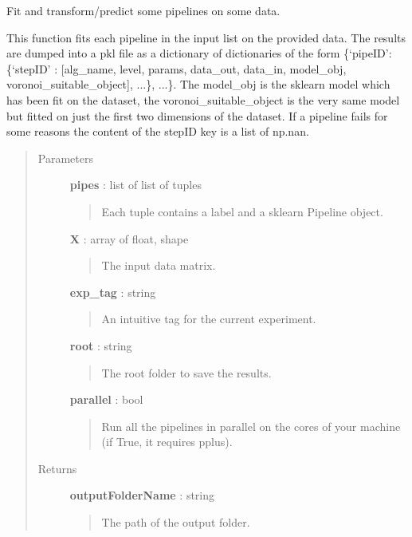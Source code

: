 \documentclass[letterpaper,10pt,english]{sphinxmanual}
\begin{document}
\begin{fulllineitems}
\label{index:adenine.core.pipelines.run}
Fit and transform/predict some pipelines on some data.

This function fits each pipeline in the input list on the provided data. The results are dumped into a pkl file as a dictionary of dictionaries of the form \{`pipeID': \{`stepID' : {[}alg\_name, level, params, data\_out, data\_in, model\_obj, voronoi\_suitable\_object{]}, ...\}, ...\}. The model\_obj is the sklearn model which has been fit on the dataset, the voronoi\_suitable\_object is the very same model but fitted on just the first two dimensions of the dataset. If a pipeline fails for some reasons the content of the stepID key is a list of np.nan.
\begin{quote}\begin{description}
\item[{Parameters}] \leavevmode
\textbf{pipes} : list of list of tuples
\begin{quote}

Each tuple contains a label and a sklearn Pipeline object.
\end{quote}

\textbf{X} : array of float, shape
\begin{quote}

The input data matrix.
\end{quote}

\textbf{exp\_tag} : string
\begin{quote}

An intuitive tag for the current experiment.
\end{quote}

\textbf{root} : string
\begin{quote}

The root folder to save the results.
\end{quote}

\textbf{parallel} : bool
\begin{quote}

Run all the pipelines in parallel on the cores of your machine (if True, it requires pplus).
\end{quote}

\item[{Returns}] \leavevmode
\textbf{outputFolderName} : string
\begin{quote}

The path of the output folder.
\end{quote}

\end{description}\end{quote}

\end{fulllineitems}
\end{document}
